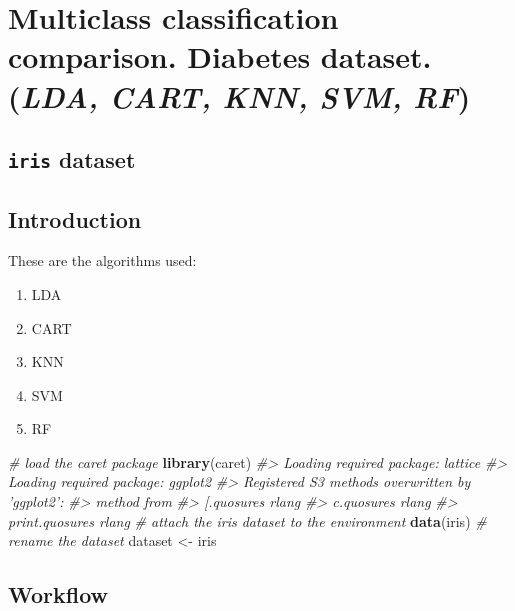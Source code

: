 \documentclass[]{book}
\newenvironment{Shaded}{\begin{snugshade}}{\end{snugshade}}
\newcommand{\CommentTok}[1]{\textcolor[rgb]{0.56,0.35,0.01}{\textit{#1}}}
\newcommand{\KeywordTok}[1]{\textcolor[rgb]{0.13,0.29,0.53}{\textbf{#1}}}
\newcommand{\NormalTok}[1]{#1}
\newcommand{\StringTok}[1]{\textcolor[rgb]{0.31,0.60,0.02}{#1}}
\providecommand{\tightlist}{%
  \setlength{\itemsep}{0pt}\setlength{\parskip}{0pt}}
\begin{document}
\hypertarget{multiclass-classification-comparison.-diabetes-dataset.-lda-cart-knn-svm-rf}{%
\chapter{\texorpdfstring{Multiclass classification comparison. Diabetes dataset. (\emph{LDA, CART, KNN, SVM, RF})}{Multiclass classification comparison. Diabetes dataset. (LDA, CART, KNN, SVM, RF)}}\label{multiclass-classification-comparison.-diabetes-dataset.-lda-cart-knn-svm-rf}}

\hypertarget{iris-dataset}{%
\section{\texorpdfstring{\texttt{iris} dataset}{iris dataset}}\label{iris-dataset}}

\hypertarget{introduction-2}{%
\section{Introduction}\label{introduction-2}}

These are the algorithms used:

\begin{enumerate}
\def\labelenumi{\arabic{enumi}.}
\tightlist
\item
  LDA
\item
  CART
\item
  KNN
\item
  SVM
\item
  RF
\end{enumerate}

\begin{Shaded}
\begin{Highlighting}[]
\CommentTok{# load the caret package}
\KeywordTok{library}\NormalTok{(caret)}
\CommentTok{#> Loading required package: lattice}
\CommentTok{#> Loading required package: ggplot2}
\CommentTok{#> Registered S3 methods overwritten by 'ggplot2':}
\CommentTok{#>   method         from }
\CommentTok{#>   [.quosures     rlang}
\CommentTok{#>   c.quosures     rlang}
\CommentTok{#>   print.quosures rlang}
\CommentTok{# attach the iris dataset to the environment}
\KeywordTok{data}\NormalTok{(iris)}
\CommentTok{# rename the dataset}
\NormalTok{dataset <-}\StringTok{ }\NormalTok{iris}
\end{Highlighting}
\end{Shaded}

\hypertarget{workflow-1}{%
\section{Workflow}\label{workflow-1}}
\end{document}
